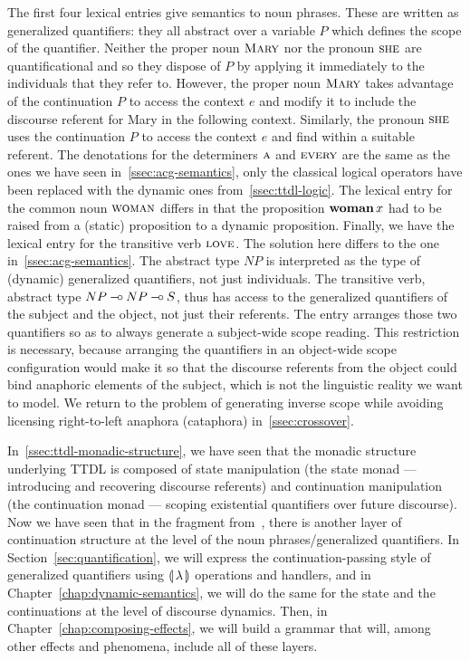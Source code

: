 The first four lexical entries give semantics to noun phrases. These are
written as generalized quantifiers: they all abstract over a variable $P$
which defines the scope of the quantifier. Neither the proper noun
$\textsc{Mary}$ nor the pronoun $\textsc{she}$ are quantificational and so they
dispose of $P$ by applying it immediately to the individuals that they
refer to. However, the proper noun $\textsc{Mary}$ takes advantage of the
continuation $P$ to access the context $e$ and modify it to include the
discourse referent for Mary in the following context. Similarly, the
pronoun $\textsc{she}$ uses the continuation $P$ to access the context $e$ and
find within a suitable referent. The denotations for the determiners
$\textsc{a}$ and $\textsc{every}$ are the same as the ones we have seen
in~\ref{ssec:acg-semantics}, only the classical logical operators have been
replaced with the dynamic ones from~\ref{ssec:ttdl-logic}. The lexical
entry for the common noun $\textsc{woman}$ differs in that the proposition
$\textbf{woman}\,x$ had to be raised from a (static) proposition to a
dynamic proposition. Finally, we have the lexical entry for the transitive
verb $\textsc{love}$. The solution here differs to the one
in~\ref{ssec:acg-semantics}. The abstract type $NP$ is interpreted as the
type of (dynamic) generalized quantifiers, not just individuals. The
transitive verb, abstract type $NP \mathbin{{-}\mkern-3.5mu{\circ}} NP \mathbin{{-}\mkern-3.5mu{\circ}} S$, thus has access to
the generalized quantifiers of the subject and the object, not just their
referents. The entry arranges those two quantifiers so as to always
generate a subject-wide scope reading. This restriction is necessary,
because arranging the quantifiers in an object-wide scope configuration
would make it so that the discourse referents from the object could bind
anaphoric elements of the subject, which is not the linguistic reality we
want to model. We return to the problem of generating inverse scope while
avoiding licensing right-to-left anaphora (cataphora)
in~\ref{ssec:crossover}.

In~\ref{ssec:ttdl-monadic-structure}, we have seen that the monadic
structure underlying TTDL is composed of state manipulation (the state
monad --- introducing and recovering discourse referents) and continuation
manipulation (the continuation monad --- scoping existential quantifiers
over future discourse). Now we have seen that in the fragment
from~\cite{de2006towards}, there is another layer of continuation structure
at the level of the noun phrases/generalized quantifiers. In
Section~\ref{sec:quantification}, we will express the continuation-passing
style of generalized quantifiers using ${\llparenthesis \, \lambda \, \rrparenthesis}$ operations and handlers, and
in Chapter~\ref{chap:dynamic-semantics}, we will do the same for the state
and the continuations at the level of discourse dynamics. Then, in
Chapter~\ref{chap:composing-effects}, we will build a grammar that will,
among other effects and phenomena, include all of these layers.

